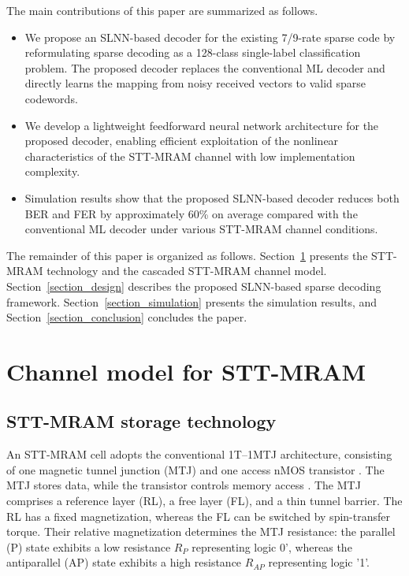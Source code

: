 \documentclass[conference]{IEEEtran}
\begin{document}

The main contributions of this paper are summarized as follows.

\begin{itemize}
\item We propose an SLNN-based decoder for the existing 7/9-rate sparse code by reformulating sparse decoding as a 128-class single-label classification problem. The proposed decoder replaces the conventional ML decoder and directly learns the mapping from noisy received vectors to valid sparse codewords.

\item We develop a lightweight feedforward neural network architecture for the proposed decoder, enabling efficient exploitation of the nonlinear characteristics of the STT-MRAM channel with low implementation complexity.

\item Simulation results show that the proposed SLNN-based decoder reduces both BER and FER by approximately 60\% on average compared with the conventional ML decoder under various STT-MRAM channel conditions.

\end{itemize}

The remainder of this paper is organized as follows. Section~\ref{section_theory} presents the STT-MRAM technology and the cascaded STT-MRAM channel model. Section~\ref{section_design} describes the proposed SLNN-based sparse decoding framework. Section~\ref{section_simulation} presents the simulation results, and Section~\ref{section_conclusion} concludes the paper.

\section{Channel model for STT-MRAM} \label{section_theory}
\subsection{STT-MRAM storage technology}

An STT-MRAM cell adopts the conventional 1T--1MTJ architecture, consisting of one magnetic tunnel junction (MTJ) and one access nMOS transistor \cite{nguyen2023improving}. The MTJ stores data, while the transistor controls memory access \cite{cai2017cascaded}. The MTJ comprises a reference layer (RL), a free layer (FL), and a thin tunnel barrier. The RL has a fixed magnetization, whereas the FL can be switched by spin-transfer torque. Their relative magnetization determines the MTJ resistance: the parallel (P) state exhibits a low resistance $R_P$ representing logic 0', whereas the antiparallel (AP) state exhibits a high resistance $R_{AP}$ representing logic '1'.
\end{document}
